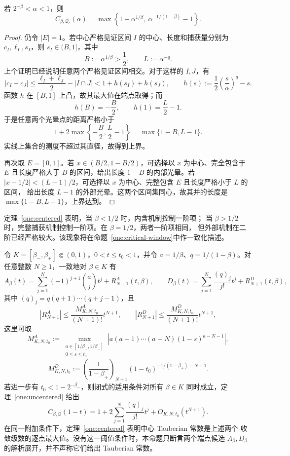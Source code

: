 \begin{theorem}[一维中心精确常数]\label{one:centered}
若 $2^{-\beta}<\alpha<1$，则
\[
 C_{\beta,\mathcal Q_c}(\alpha)
 =\max\left\{1-\alpha^{1/\beta},\
 \alpha^{-1/(1-\beta)}-1\right\}.
\]
\end{theorem}

\begin{proof}
仍令 $|E|=1$。若中心严格见证区间 $I$ 的中心、长度和捕获量分别为
$c_I,\ell_I,s_I$，则 $s_I\in(B,1]$，其中
\[
 B:=\alpha^{1/\beta}>\frac12,\qquad L:=\alpha^{-q}.
\]
上个证明已经说明任意两个严格见证区间相交。对于这样的 $I,J$，有
\[
 |c_I-c_J|
 \le\frac{\ell_I+\ell_J}{2}-|I\cap J|
 <1+h(s_I)+h(s_J),
 \qquad h(s):=\frac12\left(\frac{s}{\alpha}\right)^q-s.
\]
函数 $h$ 在 $[B,1]$ 上凸，故其最大值在端点取得；而
\[
 h(B)=-\frac{B}{2},\qquad h(1)=\frac L2-1.
\]
于是任意两个光晕点的距离严格小于
\[
 1+2\max\left\{-\frac B2,\frac L2-1\right\}
 =\max\{1-B,L-1\}.
\]
实线上集合的测度不超过其直径，故得到上界。

再次取 $E=[0,1]$。若 $x\in(B/2,1-B/2)$，可选择以 $x$ 为中心、完全包含于
$E$ 且长度严格大于 $B$ 的区间，给出长度 $1-B$ 的内部光晕。若
$|x-1/2|<(L-1)/2$，可选择以 $x$ 为中心、完整包含 $E$ 且长度严格小于 $L$ 的区间，
给出长度 $L-1$ 的外部光晕。这两个区间集同心，故其并的长度是
$\max\{1-B,L-1\}$，上界达到。
\end{proof}

\begin{remark}[一阶相变]\label{one:first-order-phase}
定理~\ref{one:centered} 表明，当 $\beta<1/2$ 时，内含机制控制一阶项；
当 $\beta>1/2$ 时，完整捕获机制控制一阶项。在 $\beta=1/2$，两者一阶项相同，
但外部机制在二阶已经严格较大。该现象将在命题~\ref{one:critical-window}中作一致化描述。
\end{remark}

\begin{proposition}\label{one:all-orders}
令 $K=[\beta_-,\beta_+]\Subset(0,1)$，$0<t\le t_0<1$，并令
$a=1/\beta$、$q=1/(1-\beta)$。对任意整数 $N\ge1$，一致地对
$\beta\in K$ 有
\[
 A_\beta(t)=\sum_{j=1}^{N}(-1)^{j+1}\binom{a}{j}t^j+R^A_{N+1}(t,\beta),
 \qquad
 D_\beta(t)=\sum_{j=1}^{N}\frac{(q)_j}{j!}t^j+R^D_{N+1}(t,\beta),
\]
其中 $(q)_j=q(q+1)\cdots(q+j-1)$，且
\[
 |R^A_{N+1}|\le\frac{M^A_{K,N,t_0}}{(N+1)!}t^{N+1},
 \qquad
 |R^D_{N+1}|\le\frac{M^D_{K,N,t_0}}{(N+1)!}t^{N+1},
\]
这里可取
\[
 M^A_{K,N,t_0}:=
 \max_{\substack{a\in[1/\beta_+,1/\beta_-]\\0\le s\le t_0}}
 \left|a(a-1)\cdots(a-N)(1-s)^{a-N-1}\right|,
\]
\[
 M^D_{K,N,t_0}:=
 \left(\frac1{1-\beta_+}\right)_{N+1}
 (1-t_0)^{-1/(1-\beta_+)-N-1}.
\]
若进一步有 $t_0<1-2^{-\beta_-}$，则闭式的适用条件对所有
$\beta\in K$ 同时成立，定理~\ref{one:uncentered} 给出
\[
 C_{\beta,\mathcal Q}(1-t)
 =1+2\sum_{j=1}^{N}\frac{(q)_j}{j!}t^j+O_{K,N,t_0}(t^{N+1}).
\]
在同一附加条件下，定理~\ref{one:centered} 表明中心 Tauberian 常数是上述两个
收敛级数的逐点最大值。没有这一阈值条件时，本命题只断言两个端点候选
$A_\beta,D_\beta$ 的解析展开，并不声称它们给出 Tauberian 常数。
\end{proposition}

